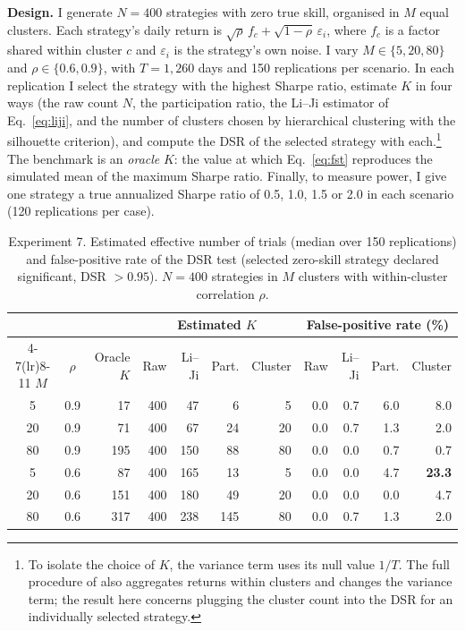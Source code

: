\documentclass[11pt]{article}
\begin{document}
\textbf{Design.} I generate $N = 400$ strategies with zero true skill, organised in $M$ equal clusters. Each strategy's daily return is $\sqrt{\rho}\,f_c + \sqrt{1-\rho}\,\varepsilon_i$, where $f_c$ is a factor shared within cluster $c$ and $\varepsilon_i$ is the strategy's own noise. I vary $M \in \{5, 20, 80\}$ and $\rho \in \{0.6, 0.9\}$, with $T = 1{,}260$ days and 150 replications per scenario. In each replication I select the strategy with the highest Sharpe ratio, estimate $K$ in four ways (the raw count $N$, the participation ratio, the Li--Ji estimator of Eq.~\eqref{eq:liji}, and the number of clusters chosen by hierarchical clustering with the silhouette criterion), and compute the DSR of the selected strategy with each.\footnote{To isolate the choice of $K$, the variance term uses its null value $1/T$. The full procedure of \citet{lopezdeprado2019lewis} also aggregates returns within clusters and changes the variance term; the result here concerns plugging the cluster count into the DSR for an individually selected strategy.} The benchmark is an \emph{oracle} $K$: the value at which Eq.~\eqref{eq:fst} reproduces the simulated mean of the maximum Sharpe ratio. Finally, to measure power, I give one strategy a true annualized Sharpe ratio of 0.5, 1.0, 1.5 or 2.0 in each scenario (120 replications per case).

\begin{table}[h]
\centering
\caption{Experiment 7. Estimated effective number of trials (median over 150 replications) and false-positive rate of the DSR test (selected zero-skill strategy declared significant, DSR $> 0.95$). $N = 400$ strategies in $M$ clusters with within-cluster correlation $\rho$.}
\label{tab:exp7}
\small
\setlength{\tabcolsep}{4.5pt}
\begin{tabular}{cc r rrrr rrrr}
\toprule
 & & & \multicolumn{4}{c}{Estimated $K$} & \multicolumn{4}{c}{False-positive rate (\%)} \\
\cmidrule(lr){4-7}\cmidrule(lr){8-11}
$M$ & $\rho$ & Oracle $K$ & Raw & Li--Ji & Part. & Cluster & Raw & Li--Ji & Part. & Cluster \\
\midrule
5  & 0.9 & 17  & 400 & 47  & 6   & 5  & 0.0 & 0.7 & 6.0 & 8.0 \\
20 & 0.9 & 71  & 400 & 67  & 24  & 20 & 0.0 & 0.7 & 1.3 & 2.0 \\
80 & 0.9 & 195 & 400 & 150 & 88  & 80 & 0.0 & 0.0 & 0.7 & 0.7 \\
5  & 0.6 & 87  & 400 & 165 & 13  & 5  & 0.0 & 0.0 & 4.7 & \textbf{23.3} \\
20 & 0.6 & 151 & 400 & 180 & 49  & 20 & 0.0 & 0.0 & 0.0 & 4.7 \\
80 & 0.6 & 317 & 400 & 238 & 145 & 80 & 0.0 & 0.7 & 1.3 & 2.0 \\
\bottomrule
\end{tabular}
\end{table}
\end{document}
